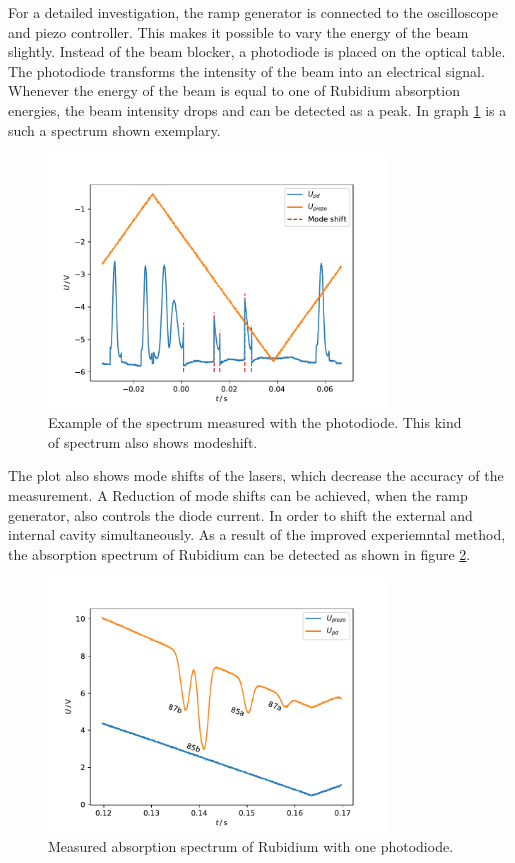 For a detailed investigation, the ramp generator is connected to the oscilloscope
and piezo controller. This makes it possible to vary the energy of the beam slightly.
Instead of the beam blocker, a photodiode is placed on the
optical table. The photodiode transforms the intensity of the beam into an
electrical signal. Whenever the energy of the beam is equal to one of Rubidium
absorption energies, the beam intensity drops and can be detected as a peak.
In graph \ref{fig: spectrum} is a such a spectrum shown exemplary.
\begin{figure}
  \centering
  \includegraphics[width = 0.8\textwidth]{../analysis/plots/modeshift.pdf}
  \caption{Example of the spectrum measured with the photodiode. This kind of spectrum also
          shows modeshift.}
  \label{fig: spectrum}
\end{figure}
The plot also shows mode shifts of the lasers, which decrease the accuracy of the
measurement. A Reduction of mode shifts can be achieved, when the ramp generator,
also controls the diode current. In order to shift the external and internal cavity
simultaneously. As a result of the improved experiemntal method, the absorption
spectrum of Rubidium can be detected as shown in figure \ref{fig: spectrum_measured}.
\begin{figure}
  \centering
  \includegraphics[width = 0.8\textwidth]{../analysis/plots/spectrum_angled.pdf}
  \caption{Measured absorption spectrum of Rubidium with one photodiode.}
  \label{fig: spectrum_measured}
\end{figure}

